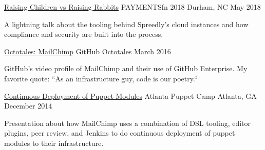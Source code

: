 

\begin{cventries}

  \cventry
    {\href{https://youtu.be/12mvlfhCQRw}{Raising Children vs Raising Rabbits}} %
    {PAYMENTSfn 2018} %
    {Durham, NC} %
    {May 2018} %
    {
      \begin{cvitems} %
        \item {A lightning talk about the tooling behind Spreedly's cloud instances and how compliance and security are built into the process.}
      \end{cvitems}
    }

  \cventry
    {\href{https://youtu.be/OeBZUW-9i0M}{Octotales: MailChimp}} %
    {GitHub Octotales} %
    {} %
    {March 2016} %
    {
      \begin{cvitems} %
        \item {GitHub's video profile of MailChimp and their use of GitHub Enterprise. My favorite quote: ``As an infrastructure guy, code is our poetry.``}
      \end{cvitems}
    }

  \cventry
    {\href{https://youtu.be/81os_qau_0c}{Continuous Deployment of Puppet Modules}} %
    {Atlanta Puppet Camp} %
    {Atlanta, GA} %
    {December 2014} %
    {
      \begin{cvitems} %
        \item {Presentation about how MailChimp uses a combination of DSL tooling, editor plugins, peer review, and Jenkins to do continuous deployment of puppet modules to their infrastructure.}
      \end{cvitems}
    }

\end{cventries}
